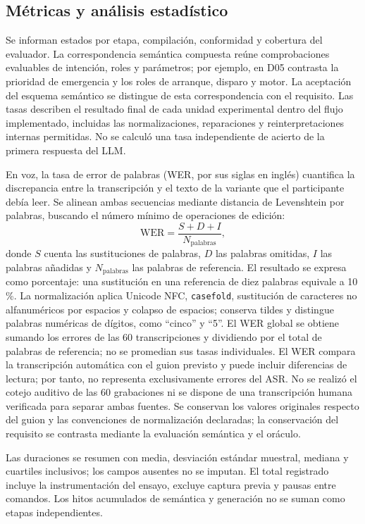 \documentclass[a4paper,fleqn]{cas-dc}
\begin{document}
\subsection{Métricas y análisis estadístico}
\label{sec:metricas}
\label{sec:estadistica}
Se informan estados por etapa, compilación, conformidad y cobertura del evaluador. La correspondencia semántica compuesta reúne comprobaciones evaluables de intención, roles y parámetros; por ejemplo, en D05 contrasta la prioridad de emergencia y los roles de arranque, disparo y motor. La aceptación del esquema semántico se distingue de esta correspondencia con el requisito. Las tasas describen el resultado final de cada unidad experimental dentro del flujo implementado, incluidas las normalizaciones, reparaciones y reinterpretaciones internas permitidas. No se calculó una tasa independiente de acierto de la primera respuesta del LLM.

En voz, la tasa de error de palabras (WER, por sus siglas en inglés) cuantifica la discrepancia entre la transcripción y el texto de la variante que el participante debía leer. Se alinean ambas secuencias mediante distancia de Levenshtein por palabras, buscando el número mínimo de operaciones de edición:
\begin{equation}
\mathrm{WER}=\frac{S+D+I}{N_{\mathrm{palabras}}},
\label{eq:wer}
\end{equation}
donde $S$ cuenta las sustituciones de palabras, $D$ las palabras omitidas, $I$ las palabras añadidas y $N_{\mathrm{palabras}}$ las palabras de referencia. El resultado se expresa como porcentaje: una sustitución en una referencia de diez palabras equivale a 10\,\%. La normalización aplica Unicode NFC, \texttt{casefold}, sustitución de caracteres no alfanuméricos por espacios y colapso de espacios; conserva tildes y distingue palabras numéricas de dígitos, como ``cinco'' y ``5''. El WER global se obtiene sumando los errores de las 60 transcripciones y dividiendo por el total de palabras de referencia; no se promedian sus tasas individuales. El WER compara la transcripción automática con el guion previsto y puede incluir diferencias de lectura; por tanto, no representa exclusivamente errores del ASR. No se realizó el cotejo auditivo de las 60 grabaciones ni se dispone de una transcripción humana verificada para separar ambas fuentes. Se conservan los valores originales respecto del guion y las convenciones de normalización declaradas; la conservación del requisito se contrasta mediante la evaluación semántica y el oráculo.

Las duraciones se resumen con media, desviación estándar muestral, mediana y cuartiles inclusivos; los campos ausentes no se imputan. El total registrado incluye la instrumentación del ensayo, excluye captura previa y pausas entre comandos. Los hitos acumulados de semántica y generación no se suman como etapas independientes.
\end{document}

